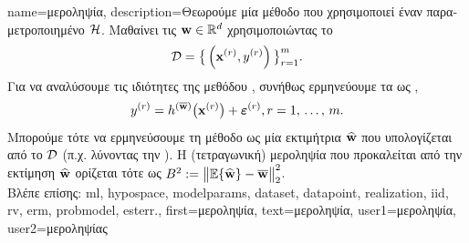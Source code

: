 {name={\foreignlanguage{greek}{μεροληψία}},
	description={\foreignlanguage{greek}{Θεωρούμε μία μέθοδο} 
		 \foreignlanguage{greek}{που χρησιμοποιεί έναν παραμετροποιημένο}  $\mathcal{H}$. 
		\foreignlanguage{greek}{Μαθαίνει τις}  ${\bf w} \in \mathbb{R}^{d}$ 
		\foreignlanguage{greek}{χρησιμοποιώντας το}  
		$$\mathcal{D}=\big\{ \left( {\bf x}^{(r)},y^{(r)} \right) \big\}_{r=1}^{m}.$$ 
		\foreignlanguage{greek}{Για να αναλύσουμε τις ιδιότητες της μεθόδου} , \foreignlanguage{greek}{συνήθως 
		ερμηνεύουμε τα}  \foreignlanguage{greek}{ως}   , 
		$$y^{(r)} = h^{(\overline{{\bf w}})}\big( {\bf x}^{(r)} \big) + \bm{\varepsilon}^{(r)}, r=1, \,\ldots, \,m.$$ 
		\foreignlanguage{greek}{Μπορούμε τότε να ερμηνεύσουμε τη μέθοδο}  \foreignlanguage{greek}{ως μία 
		εκτιμήτρια $\widehat{{\bf w}}$ που υπολογίζεται από το $\mathcal{D}$ (π.χ. λύνοντας την} ). 
		\foreignlanguage{greek}{Η (τετραγωνική) μεροληψία που προκαλείται από την εκτίμηση $\widehat{{\bf w}}$ ορίζεται τότε ως} 
		$B^{2} := \big\| \mathbb{E} \{ \widehat{{\bf w}}  \}- \overline{{\bf w}}\big\|_{2}^{2}$.\\
		\foreignlanguage{greek}{Βλέπε επίσης:} \gls{ml}, \gls{hypospace}, \glspl{modelparam}, \gls{dataset}, \gls{datapoint}, \gls{realization}, \gls{iid}, 
		\gls{rv}, \gls{erm}, \gls{probmodel}, \gls{esterr}.},
	first={\foreignlanguage{greek}{μεροληψία}},
	text={\foreignlanguage{greek}{μεροληψία}},
	user1={\foreignlanguage{greek}{μεροληψία}}, %
	user2={\foreignlanguage{greek}{μεροληψίας}} %
}

